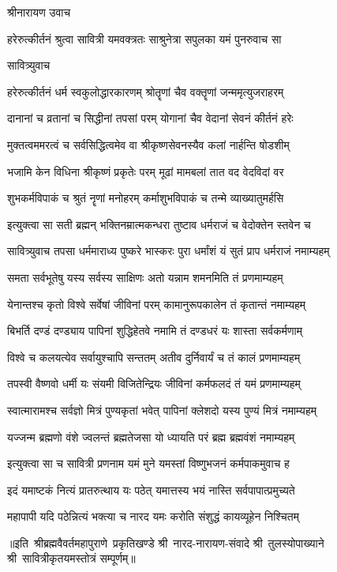 
श्रीनारायण उवाच

\twolineshloka
{हरेरुत्कीर्तनं श्रुत्वा सावित्री यमवक्त्रतः}
{साश्रुनेत्रा सपुलका यमं पुनरुवाच सा}%

सावित्र्युवाच\nopagebreak[4]

\twolineshloka
{हरेरुत्कीर्तनं धर्म स्वकुलोद्धारकारणम्}
{श्रोतॄणां चैव वक्तॄणां जन्ममृत्युजराहरम्}%

\twolineshloka
{दानानां च व्रतानां च सिद्धीनां तपसां परम्}
{योगानां चैव वेदानां सेवनं कीर्तनं हरेः}%

\twolineshloka
{मुक्तत्वममरत्वं च सर्वसिद्धित्वमेव वा}
{श्रीकृष्णसेवनस्यैव कलां नार्हन्ति षोडशीम्}%

\twolineshloka
{भजामि केन विधिना श्रीकृष्णं प्रकृतेः परम्}
{मूढां मामबलां तात वद वेदविदां वर}%

\twolineshloka
{शुभकर्मविपाकं च श्रुतं नॄणां मनोहरम्}
{कर्माशुभविपाकं च तन्मे व्याख्यातुमर्हसि}%

\twolineshloka
{इत्युक्त्वा सा सती ब्रह्मन् भक्तिनम्रात्मकन्धरा}
{तुष्टाव धर्मराजं च वेदोक्तेन स्तवेन च}%

सावित्र्युवाच
\twolineshloka
{तपसा धर्ममाराध्य पुष्करे भास्करः पुरा}
{धर्मांशं यं सुतं प्राप धर्मराजं नमाम्यहम्}%

\twolineshloka
{समता सर्वभूतेषु यस्य सर्वस्य साक्षिणः}
{अतो यन्नाम शमनमिति तं प्रणमाम्यहम्}%

\twolineshloka
{येनान्तश्च कृतो विश्वे सर्वेषां जीविनां परम्}
{कामानुरूपकालेन तं कृतान्तं नमाम्यहम्}%

\twolineshloka
{बिभर्ति दण्डं दण्ड्याय पापिनां शुद्धिहेतवे}
{नमामि तं दण्डधरं यः शास्ता सर्वकर्मणाम्}%

\twolineshloka
{विश्वे च कलयत्येव सर्वायुश्चापि सन्ततम्}
{अतीव दुर्निवार्यं च तं कालं प्रणमाम्यहम्}%

\twolineshloka
{तपस्वी वैष्णवो धर्मी यः संयमी विजितेन्द्रियः}
{जीविनां कर्मफलदं तं यमं प्रणमाम्यहम्}%

\twolineshloka
{स्वात्मारामश्च सर्वज्ञो मित्रं पुण्यकृतां भवेत्}
{पापिनां क्लेशदो यस्य पुण्यं मित्रं नमाम्यहम्}%

\twolineshloka
{यज्जन्म ब्रह्मणो वंशे ज्वलन्तं ब्रह्मतेजसा}
{यो ध्यायति परं ब्रह्म ब्रह्मवंशं नमाम्यहम्}%

\twolineshloka
{इत्युक्त्वा सा च सावित्री प्रणनाम यमं मुने}
{यमस्तां विष्णुभजनं कर्मपाकमुवाच ह}%

\twolineshloka
{इदं यमाष्टकं नित्यं प्रातरुत्थाय यः पठेत्}
{यमात्तस्य भयं नास्ति सर्वपापात्प्रमुच्यते}%

\twolineshloka
{महापापी यदि पठेन्नित्यं भक्त्या च नारद}
{यमः करोति संशुद्धं कायव्यूहेन निश्चितम्}%

{॥इति~श्रीब्रह्मवैवर्तमहापुराणे~प्रकृतिखण्डे श्री~नारद-नारायण-संवादे श्री~तुलस्योपाख्याने श्री~सावित्रीकृतयमस्तोत्रं सम्पूर्णम्॥}